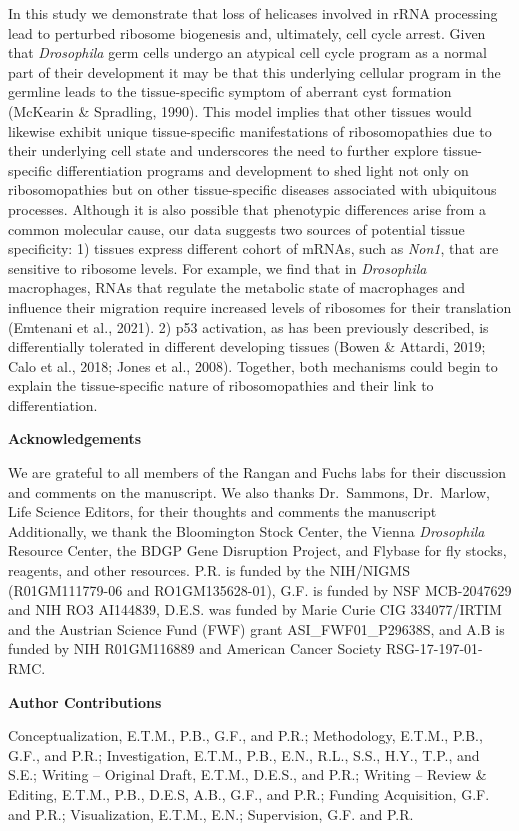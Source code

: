 \documentclass[12pt,twoside]{reedthesis}
\begin{document}
In this study we demonstrate that loss of helicases involved in rRNA
processing lead to perturbed ribosome biogenesis and, ultimately, cell
cycle arrest. Given that \emph{Drosophila} germ cells undergo an atypical
cell cycle program as a normal part of their development it may be that
this underlying cellular program in the germline leads to the
tissue-specific symptom of aberrant cyst formation (McKearin \& Spradling, 1990).
This model implies that other tissues would likewise exhibit unique
tissue-specific manifestations of ribosomopathies due to their
underlying cell state and underscores the need to further explore
tissue-specific differentiation programs and development to shed light
not only on ribosomopathies but on other tissue-specific diseases
associated with ubiquitous processes. Although it is also possible that
phenotypic differences arise from a common molecular cause, our data
suggests two sources of potential tissue specificity: 1) tissues express
different cohort of mRNAs, such as \emph{Non1}, that are sensitive to
ribosome levels. For example, we find that in \emph{Drosophila} macrophages,
RNAs that regulate the metabolic state of macrophages and influence
their migration require increased levels of ribosomes for their
translation (Emtenani et al., 2021). 2) p53 activation,
as has been previously described, is differentially tolerated in
different developing tissues (Bowen \& Attardi, 2019; Calo et al., 2018; Jones et al., 2008). Together,
both mechanisms could begin to explain the tissue-specific nature of
ribosomopathies and their link to differentiation.

\textbf{{Acknowledgements}}

We are grateful to all members of the Rangan and Fuchs labs for their
discussion and comments on the manuscript. We also thanks Dr.~Sammons,
Dr.~Marlow, Life Science Editors, for their thoughts and comments the
manuscript Additionally, we thank the Bloomington Stock Center, the
Vienna \emph{Drosophila} Resource Center, the BDGP Gene Disruption Project,
and Flybase for fly stocks, reagents, and other resources. P.R. is
funded by the NIH/NIGMS (R01GM111779-06 and RO1GM135628-01), G.F. is
funded by NSF MCB-2047629 and NIH RO3 AI144839, D.E.S. was funded by
Marie Curie CIG 334077/IRTIM and the Austrian Science Fund (FWF) grant
ASI\_FWF01\_P29638S, and A.B is funded by NIH R01GM116889 and American
Cancer Society RSG-17-197-01-RMC.

\textbf{{Author Contributions}}

Conceptualization, E.T.M., P.B., G.F., and P.R.; Methodology, E.T.M.,
P.B., G.F., and P.R.; Investigation, E.T.M., P.B., E.N., R.L., S.S.,
H.Y., T.P., and S.E.; Writing -- Original Draft, E.T.M., D.E.S., and
P.R.; Writing -- Review \& Editing, E.T.M., P.B., D.E.S, A.B., G.F., and
P.R.; Funding Acquisition, G.F. and P.R.; Visualization, E.T.M., E.N.;
Supervision, G.F. and P.R.
\end{document}
